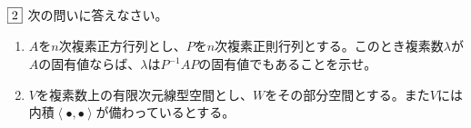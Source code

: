 \documentclass[dvipdfmx]{jsreport}
\newcommand{\innerproduct}[2]{\left\langle{#1}, {#2}\right\rangle}
\newcounter{num}[section]
\begin{document}
\begin{tcolorbox} %
	$\fbox{2}$ 次の問いに答えなさい。
\begin{enumerate}
	\item $A$を$n$次複素正方行列とし、$P$を$n$次複素正則行列とする。このとき複素数$\lambda$が$A$の固有値ならば、$\lambda$は$P^{-1}AP$の固有値でもあることを示せ。
	\item $V$を複素数上の有限次元線型空間とし、$W$をその部分空間とする。また$V$には内積$\innerproduct{\bullet}{\bullet}$が備わっているとする。
\end{enumerate}
\end{tcolorbox}
\end{document}

